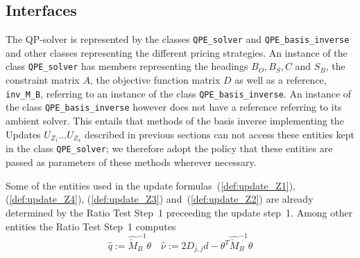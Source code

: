 \documentclass[a4paper]{article}
\begin{document}
\subsection{Interfaces}
The QP-solver is represented by the classes \texttt{QPE\_solver} and
\texttt{QPE\_basis\_inverse} and other classes representing the different
pricing strategies. An instance of the class \texttt{QPE\_solver} has
members representing the headings $B_{O},B_{S}, C$ and $S_{B}$,
the constraint matrix $A$, the objective function matrix $D$ as well as a
reference, \texttt{inv\_M\_B}, referring to an instance of the class
\texttt{QPE\_basis\_inverse}. An instance of the class
\texttt{QPE\_basis\_inverse} however does not have a reference
referring to its ambient solver. This entails that methods of the basis inverse
implementing the Updates $U_{Z_{1}} \dots U_{Z_{4}}$ described in previous
sections can not access these entities kept in the class \texttt{QPE\_solver};
we therefore adopt the policy that these entities are passed as parameters of
these methods wherever necessary.   

Some of the entities used in the update formulas~(\ref{def:update_Z1}),
(\ref{def:update_Z4}), (\ref{def:update_Z3}) and~(\ref{def:update_Z2})
are already determined by the Ratio Test Step~1 preceeding the update step~1.
Among other entities the Ratio Test Step~1 computes
\begin{equation}
\label{def:q_hat_nu_hat}
\hat{q}:=\hat{\check{M}}_{B}^{-1}\theta
\quad
\hat{\nu}:=2D_{j,j}d-\theta^{T}\hat{\check{M}}_{B}^{-1}\theta
\end{equation}  
\end{document}
